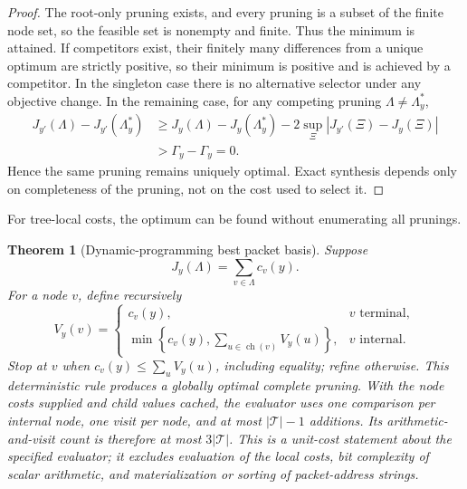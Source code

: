 \documentclass[11pt,a4paper]{article}
\newtheorem{theorem}{Theorem}[section]
\theoremstyle{definition}
\theoremstyle{remark}
\begin{document}
\begin{proof}
The root-only pruning exists, and every pruning is a subset of the finite node set, so the feasible set is nonempty and finite. Thus the minimum is attained. If competitors exist, their finitely many differences from a unique optimum are strictly positive, so their minimum is positive and is achieved by a competitor. In the singleton case there is no alternative selector under any objective change. In the remaining case, for any competing pruning $\Lambda\ne\Lambda_y^*$,
\[
\begin{aligned}
J_{y'}(\Lambda)-J_{y'}(\Lambda_y^*)
&\ge
J_y(\Lambda)-J_y(\Lambda_y^*)
-2\sup_{\Xi}|J_{y'}(\Xi)-J_y(\Xi)|\\
&>\Gamma_y-\Gamma_y=0.
\end{aligned}
\]
Hence the same pruning remains uniquely optimal.  Exact synthesis depends only on completeness of the pruning, not on the cost used to select it.
\end{proof}

For tree-local costs, the optimum can be found without enumerating all prunings.

\begin{theorem}[Dynamic-programming best packet basis]\label{result:15}
Suppose
\[
J_y(\Lambda)=\sum_{v\in\Lambda}c_v(y).
\]
For a node $v$, define recursively
\[
V_y(v)
=
\begin{cases}
c_v(y),&v\text{ terminal},\\[2mm]
\displaystyle
\min\left\{c_v(y),\sum_{u\in\operatorname{ch}(v)}V_y(u)\right\},
&v\text{ internal}.
\end{cases}
\]
Stop at $v$ when $c_v(y)\le\sum_uV_y(u)$, including equality; refine otherwise. This deterministic rule produces a globally optimal complete pruning. With the node costs supplied and child values cached, the evaluator uses one comparison per internal node, one visit per node, and at most $|\mathcal T|-1$ additions. Its arithmetic-and-visit count is therefore at most $3|\mathcal T|$. This is a unit-cost statement about the specified evaluator; it excludes evaluation of the local costs, bit complexity of scalar arithmetic, and materialization or sorting of packet-address strings.
\end{theorem}
\end{document}
